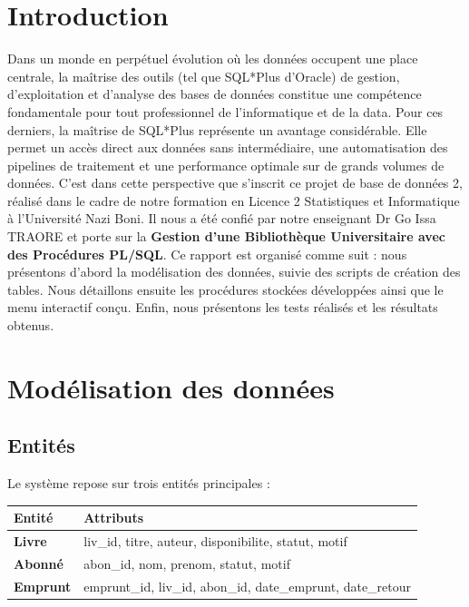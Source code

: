 \documentclass[12pt, a4paper]{report}
\begin{document}
\chapter{Introduction}

Dans un monde en perpétuel évolution où les données occupent une place centrale, la maîtrise des outils (tel que SQL*Plus d'Oracle) de gestion, d'exploitation et d'analyse des bases de données constitue une compétence fondamentale pour tout professionnel de l'informatique et de la data.
Pour ces derniers, la maîtrise de SQL*Plus représente un avantage considérable.
Elle permet un accès direct aux données sans intermédiaire, une automatisation
des pipelines de traitement et une performance optimale sur de grands volumes de données.
C'est dans cette perspective que s'inscrit ce projet de base de données 2,
réalisé dans le cadre de notre formation en Licence 2 Statistiques et
Informatique à l'Université Nazi Boni. Il nous a été confié par notre
enseignant Dr Go Issa TRAORE et porte sur la \textbf{Gestion d'une
Bibliothèque Universitaire avec des Procédures PL/SQL}.
Ce rapport est organisé comme suit : nous présentons d'abord la modélisation
des données, suivie des scripts de création des tables. Nous détaillons ensuite
les procédures stockées développées ainsi que le menu interactif conçu.
Enfin, nous présentons les tests réalisés et les résultats obtenus.

\chapter{Modélisation des données}

\section{Entités}
Le système repose sur trois entités principales :

\begin{center}
	\begin{tabular}{|>{\bfseries}l|l|}
		\hline
		\textbf{Entité} & \textbf{Attributs} \\
		\hline
		Livre & liv\_id, titre, auteur, disponibilite, statut, motif \\
		\hline
		Abonné & abon\_id, nom, prenom, statut, motif \\
		\hline
		Emprunt & emprunt\_id, liv\_id, abon\_id, date\_emprunt, date\_retour \\
		\hline
	\end{tabular}
\end{center}
\end{document}
